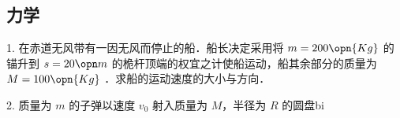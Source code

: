 \subsection{力学}
1. 在赤道无风带有一因无风而停止的船．船长决定采用将 $m=200\opn{Kg}$ 的锚升到 $s=20\opn m$ 的桅杆顶端的权宜之计使船运动，船其余部分的质量为 $M=100 \opn{Kg}$ ．求船的运动速度的大小与方向．

2. 质量为 $m$ 的子弹以速度 $v_0$ 射入质量为 $M$，半径为 $R$ 的圆盘bi